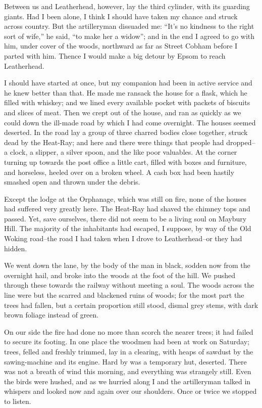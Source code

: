Between us and Leatherhead, however, lay the third cylinder, with
its guarding giants. Had I been alone, I think I should have taken
my chance and struck across country. But the artilleryman dissuaded
me: ``It's no kindness to the right sort of wife,'' he said, ``to make
her a widow''; and in the end I agreed to go with him, under cover
of the woods, northward as far as Street Cobham before I parted
with him. Thence I would make a big detour by Epsom to reach
Leatherhead.

I should have started at once, but my companion had been in active
service and he knew better than that. He made me ransack the house
for a flask, which he filled with whiskey; and we lined every
available pocket with packets of biscuits and slices of meat. Then
we crept out of the house, and ran as quickly as we could down the
ill-made road by which I had come overnight. The houses seemed
deserted. In the road lay a group of three charred bodies close
together, struck dead by the Heat-Ray; and here and there were
things that people had dropped--a clock, a slipper, a silver spoon,
and the like poor valuables. At the corner turning up towards the
post office a little cart, filled with boxes and furniture, and
horseless, heeled over on a broken wheel. A cash box had been
hastily smashed open and thrown under the debris.

Except the lodge at the Orphanage, which was still on fire, none of
the houses had suffered very greatly here. The Heat-Ray had shaved
the chimney tops and passed. Yet, save ourselves, there did not
seem to be a living soul on Maybury Hill. The majority of the
inhabitants had escaped, I suppose, by way of the Old Woking
road--the road I had taken when I drove to Leatherhead--or they had
hidden.

We went down the lane, by the body of the man in black, sodden now
from the overnight hail, and broke into the woods at the foot of
the hill. We pushed through these towards the railway without
meeting a soul. The woods across the line were but the scarred and
blackened ruins of woods; for the most part the trees had fallen,
but a certain proportion still stood, dismal grey stems, with dark
brown foliage instead of green.

On our side the fire had done no more than scorch the nearer trees;
it had failed to secure its footing. In one place the woodmen had
been at work on Saturday; trees, felled and freshly trimmed, lay in
a clearing, with heaps of sawdust by the sawing-machine and its
engine. Hard by was a temporary hut, deserted. There was not a
breath of wind this morning, and everything was strangely still.
Even the birds were hushed, and as we hurried along I and the
artilleryman talked in whispers and looked now and again over our
shoulders. Once or twice we stopped to listen.


